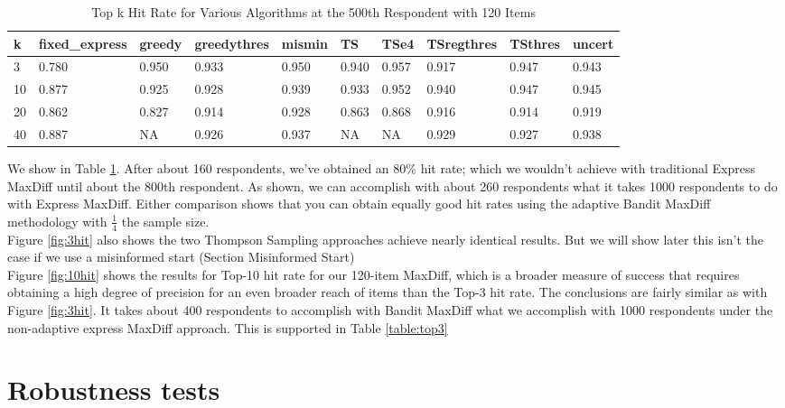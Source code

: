 \documentclass[nonblindrev]{informs3}
\begin{document}
\begin{table}
\begin{center}
\begin{tabular}{llllllllll}
\hline   k &  fixed\_express &  greedy &  greedythres &  mismin &    TS &  TSe4 &  TSregthres &  TSthres &  uncert \\ \hline   3 &          0.780 &   0.950 &        0.933 &   0.950 & 0.940 & 0.957 &       0.917 &    0.947 &   0.943 \\  10 &          0.877 &   0.925 &        0.928 &   0.939 & 0.933 & 0.952 &       0.940 &    0.947 &   0.945 \\  20 &          0.862 &   0.827 &        0.914 &   0.928 & 0.863 & 0.868 &       0.916 &    0.914 &   0.919 \\  40 &          0.887 &   NA &        0.926 &   0.937 & NA & NA &       0.929 &    0.927 &   0.938 \end{tabular}
\end{center}
\caption{Top k Hit Rate for Various Algorithms at the 500th Respondent with 120 Items}
\label{table:at500}
\end{table}
 We show in Table \ref{table:at500}. After about 160 respondents, we've obtained an 80\% hit rate; which we wouldn't achieve with traditional Express MaxDiff until about the 800th respondent.  As shown, we can accomplish with about 260 respondents what it takes 1000 respondents to do with Express MaxDiff.  Either comparison shows that you can obtain equally good hit rates using the adaptive Bandit MaxDiff methodology with $\frac{1}{4}$ the sample size.\\
Figure \ref{fig:3hit} also shows the two Thompson Sampling approaches achieve nearly identical results. But we will show later this isn't the case if we use a misinformed start (Section Misinformed Start)\\
Figure \ref{fig:10hit} shows the results for Top-10 hit rate for our 120-item MaxDiff, which is a broader measure of success that requires obtaining a high degree of precision for an even broader reach of items than the Top-3 hit rate.  The conclusions are fairly similar as with Figure \ref{fig:3hit}.  It takes about 400 respondents to accomplish with Bandit MaxDiff what we accomplish with 1000 respondents under the non-adaptive express MaxDiff approach. This is supported in Table \ref{table:top3}\\


\section{Robustness tests}
\end{document}
